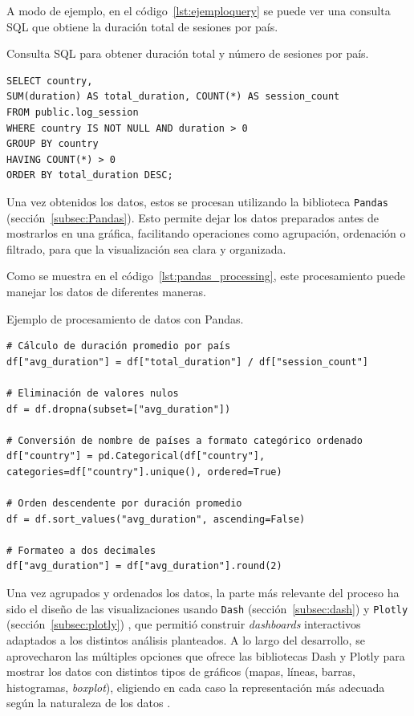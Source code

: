 \documentclass[a4paper, 12pt]{book}
\begin{document}
A modo de ejemplo, en el código~\ref{lst:ejemploquery} se puede ver una consulta SQL que obtiene la duración total de sesiones por país.

\begin{listing}[h!]
\caption{Consulta SQL para obtener duración total y número de sesiones por país.}
\label{lst:ejemploquery}
\begin{verbatim}
SELECT country,
SUM(duration) AS total_duration, COUNT(*) AS session_count
FROM public.log_session
WHERE country IS NOT NULL AND duration > 0
GROUP BY country
HAVING COUNT(*) > 0
ORDER BY total_duration DESC;
\end{verbatim}
\end{listing}

Una vez obtenidos los datos, estos se procesan utilizando la biblioteca \texttt{Pandas} (sección~\ref{subsec:Pandas}). Esto permite dejar los datos preparados antes de mostrarlos en una gráfica, facilitando operaciones como agrupación, ordenación o filtrado, para que la visualización sea clara y organizada.

Como se muestra en el código~\ref{lst:pandas_processing}, este procesamiento puede manejar los datos de diferentes maneras.

\begin{listing}[h!]
\caption{Ejemplo de procesamiento de datos con Pandas.}
\label{lst:pandas_processing}
\begin{verbatim}
# Cálculo de duración promedio por país
df["avg_duration"] = df["total_duration"] / df["session_count"]

# Eliminación de valores nulos
df = df.dropna(subset=["avg_duration"])

# Conversión de nombre de países a formato categórico ordenado
df["country"] = pd.Categorical(df["country"], categories=df["country"].unique(), ordered=True)

# Orden descendente por duración promedio
df = df.sort_values("avg_duration", ascending=False)

# Formateo a dos decimales 
df["avg_duration"] = df["avg_duration"].round(2)
\end{verbatim}
\end{listing}

Una vez agrupados y ordenados los datos, la parte más relevante del proceso ha sido el diseño de las visualizaciones usando \texttt{Dash} (sección~\ref{subsec:dash}) y \texttt{Plotly} (sección~\ref{subsec:plotly}) , que permitió construir \textit{dashboards} interactivos adaptados a los distintos análisis planteados. A lo largo del desarrollo, se aprovecharon las múltiples opciones que ofrece las bibliotecas Dash y Plotly para mostrar los datos con distintos tipos de gráficos (mapas, líneas, barras, histogramas, \textit{boxplot}), eligiendo en cada caso la representación más adecuada según la naturaleza de los datos \cite{rGraphGallery}.
\end{document}
